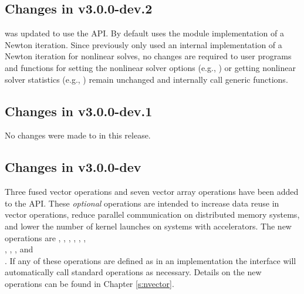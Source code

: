 \subsection*{Changes in v3.0.0-dev.2}

{\idas} was updated to use the {\sunnonlinsol} API. By default {\idas} uses the
{\sunnonlinsolnewton} module implementation of a Newton iteration. Since {\idas}
previously only used an internal implementation of a Newton iteration for
nonlinear solves, no changes are required to user programs and functions for
setting the nonlinear solver options (e.g., ) or
getting nonlinear solver statistics (e.g., ) remain
unchanged and internally call generic {\sunnonlinsol} functions.

\subsection*{Changes in v3.0.0-dev.1}

No changes were made to {\idas} in this release.

\subsection*{Changes in v3.0.0-dev}

Three fused vector operations and seven vector array operations have
been added to the {\nvector} API. These \textit{optional} operations
are intended to increase data reuse in vector operations, reduce
parallel communication on distributed memory systems, and lower the
number of kernel launches on systems with accelerators. The new
operations are 
,
,
,
,
,
,\\
,
,
, and\\
.
If any of these operations are defined as  in an {\nvector}
implementation the {\nvector} interface will automatically call
standard {\nvector} operations as necessary. Details on the new
operations can be found in Chapter \ref{s:nvector}.

